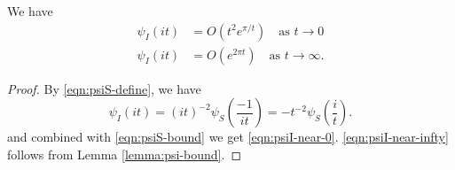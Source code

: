 
\begin{corollary}\label{cor:psiI-near-0-infty}\leanok
We have
\begin{align}
    \psi_I(it) &= O(t^2 e^{\pi/t}) \quad \text{as } t \to 0 \label{eqn:psiI-near-0} \\
    \psi_I(it) &= O(e^{2 \pi t}) \quad \text{as } t \to \infty. \label{eqn:psiI-near-infty}
\end{align}
\end{corollary}
\begin{proof}\leanok
By \eqref{eqn:psiS-define}, we have
\begin{equation}
    \psi_I(it) = (it)^{-2} \psi_S\left(\frac{-1}{it}\right) = -t^{-2} \psi_S\left(\frac{i}{t}\right).
\end{equation}
and combined with \eqref{eqn:psiS-bound} we get \eqref{eqn:psiI-near-0}.
\eqref{eqn:psiI-near-infty} follows from Lemma \ref{lemma:psi-bound}.
\end{proof}

